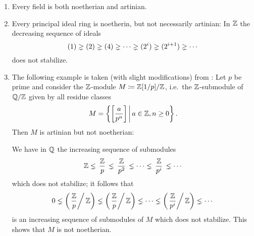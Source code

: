 \begin{example}
  \label{example: noetherian and artinian rings and modules}
  \leavevmode
  \begin{enumerate}
    \item
      Every field is both noetherian and artinian.

    \item
      \label{enumerate: noetherian but not artinian}
      Every principal ideal ring is noetherin, but not necessarily artinian:
      In $\mathbb{Z}$ the decreasing sequence of ideals
      \[
                    (1)
        \gneq (2)
        \gneq (4)
        \gneq \dotsb
        \gneq (2^i)
        \gneq (2^{i+1})
        \gneq \dotsb
      \]
      does not stabilize.
      
    \item
      \label{enumerate: artinian but not noetherian}
      The following example is taken (with slight modifications) from \cite[Chapter~6]{AtiyahMacdonald}:
      Let $p$ be prime and consider the $\mathbb{Z}$-module $M \coloneqq \mathbb{Z}[1/p]/\mathbb{Z}$, i.e.\ the $\mathbb{Z}$-submodule of $\mathbb{Q}/\mathbb{Z}$ given by all residue classes
      \[
          M
        = \left\{
            \left[ \frac{a}{p^n} \right]
          \suchthat*
            a \in \Integer,
            n \geq 0
          \right\}.
      \]
      Then $M$ is artinian but not noetherian:
      
      We have in $\mathbb{Q}$ the increasing sequence of submodules
      \[
                    \mathbb{Z}
        \lneq \,\frac{\mathbb{Z}}{p}\,
        \lneq \,\frac{\mathbb{Z}}{p^2}\,
        \lneq \dotsb
        \lneq \,\frac{\mathbb{Z}}{p^i}\,
        \lneq \dotsb
      \]
      which does not stabilize;
      it follows that
      \[
                    0
        \lneq \left( \left. \frac{\mathbb{Z}}{p} \right/\mathbb{Z} \right)
        \lneq \left( \left. \frac{\mathbb{Z}}{p} \right/\mathbb{Z} \right)
        \lneq \dotsb
        \lneq \left( \left. \frac{\mathbb{Z}}{p^i} \right/\mathbb{Z} \right)
        \lneq \dotsb
      \]
      is an increasing sequence of submodules of $M$ which does not stabilize.
      This shows that $M$ is not noetherian.
      

\end{enumerate}
\end{example}
